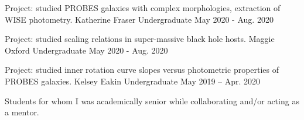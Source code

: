 \begin{cventries}
  \cventry
    {Project: studied PROBES galaxies with complex morphologies, extraction of WISE photometry.} %
    {Katherine Fraser } %
    {Undergraduate} %
    {May 2020 - Aug. 2020} %

  \cventry
    {Project: studied scaling relations in super-massive black hole hosts.} %
    {Maggie Oxford } %
    {Undergraduate} %
    {May 2020 - Aug. 2020} %
    
  \cventry
    {Project: studied inner rotation curve slopes versus photometric properties of PROBES galaxies.} %
    {Kelsey Eakin} %
    {Undergraduate} %
    {May 2019 – Apr. 2020} %

\end{cventries}


Students for whom I was academically senior while collaborating and/or acting as a mentor.\\

